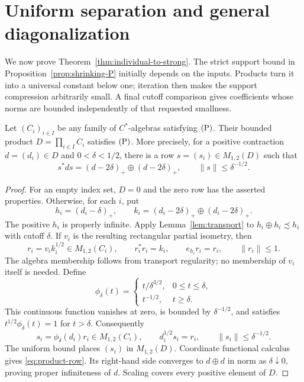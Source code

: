 \section{Uniform separation and general diagonalization}
\label{sec:separation}

We now prove Theorem~\ref{thm:individual-to-strong}.  The strict
support bound in Proposition~\ref{prop:shrinking-P} initially
depends on the inputs.  Products turn it into a universal constant
below one; iteration then makes the support compression arbitrarily
small.  A final cutoff comparison gives coefficients whose norms
are bounded independently of that requested smallness.

\begin{lemma}
\label{lem:product-P}
Let \((C_i)_{i\in I}\) be any family of \(C^*\)-algebras
satisfying \(\textup{(P)}\).  Their bounded product
\(D=\prod_{i\in I}C_i\) satisfies \(\textup{(P)}\).
More precisely, for a positive contraction \(d=(d_i)\in D\)
and \(0<\delta<1/2\), there is a row
\(s=(s_i)\in M_{1,2}(D)\) such that
\begin{equation}\label{eq:product-row}
 s^*ds=(d-2\delta)_+\oplus(d-2\delta)_+,\qquad
 \|s\|\le\delta^{-1/2}.
\end{equation}
\end{lemma}

\begin{proof}
For an empty index set, \(D=0\) and the zero row has the asserted
properties.  Otherwise, for each \(i\), put
\[
 h_i=(d_i-\delta)_+,\qquad
 k_i=(d_i-2\delta)_+\oplus(d_i-2\delta)_+.
\]
The positive \(h_i\) is properly infinite.  Apply
Lemma~\ref{lem:transport} to \(h_i\oplus h_i\precsim h_i\)
with cutoff \(\delta\).  If \(v_i\) is the resulting
rectangular partial isometry, then
\[
 r_i=v_i k_i^{1/2}\in M_{1,2}(C_i),\qquad
 r_i^*r_i=k_i,\qquad e_{h_i}r_i=r_i,\qquad \|r_i\|\le1.
\]
The algebra membership follows from transport regularity; no
membership of \(v_i\) itself is needed.  Define
\[
 \phi_\delta(t)=
 \begin{cases}
  t/\delta^{3/2},&0\le t\le\delta,\\
  t^{-1/2},&t\ge\delta.
 \end{cases}
\]
This continuous function vanishes at zero, is bounded by
\(\delta^{-1/2}\), and satisfies
\(t^{1/2}\phi_\delta(t)=1\) for \(t>\delta\).  Consequently
\[
 s_i=\phi_\delta(d_i)r_i\in M_{1,2}(C_i),\qquad
 d_i^{1/2}s_i=r_i,\qquad
 \|s_i\|\le\delta^{-1/2}.
\]
The uniform bound places \((s_i)\) in \(M_{1,2}(D)\).
Coordinate functional calculus gives
\eqref{eq:product-row}.  Its right-hand side converges to
\(d\oplus d\) in norm as \(\delta\downarrow0\), proving
proper infiniteness of \(d\).  Scaling covers every positive
element of \(D\).
\end{proof}

